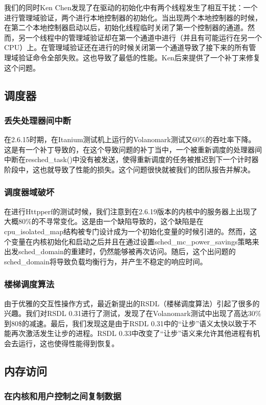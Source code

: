 我们的同时Ken Chen发现了在驱动的初始化中有两个线程发生了相互干扰：一个进行管理域验证，两个进行本地控制器的初始化。当出现两个本地控制器的时候，在第二个本地控制器启动以后，初始化线程临时关闭了第一个控制器的通道。然而，另一个线程中的管理域验证却在第一个通道中进行（并且有可能运行在另一个CPU）上。在管理域验证还在进行的时候关闭第一个通道导致了接下来的所有管理域验证命令全部失败。这也导致了最低的性能。Ken后来提供了一个补丁来修复这个问题。

\subsection{调度器}
\subsubsection{丢失处理器间中断}
在2.6.15时期，在Itanium测试机上运行的Volanomark测试又60\%的吞吐率下降。这是有一个补丁导致的，在这个导致问题的补丁当中，一个被重新调度的处理器间中断在resched\_task()中没有被发送，使得重新调度的任务被推迟到下一个计时器阶段中，这也就导致了性能的损失。这个问题很快就被我们的团队报告并解决。
\subsubsection{调度器域破坏}

在进行Httpperf的测试时候，我们注意到在2.6.19版本的内核中的服务器上出现了大概80\%的不寻常变化。这是由一个缺陷导致的，这个缺陷是在cpu\_isolated\_map结构被专门设计成为一个初始化变量的时候引进的。然而，这个变量在内核初始化和启动之后并且在通过设置sched\_mc\_power\_savings策略来出发sched\_domain的重建时，仍然能够被再次访问。随后，这个出问题的sched\_domain将导致负载均衡行为，并产生不稳定的响应时间。

\subsubsection{楼梯调度算法}
由于优雅的交互性操作方式，最近新提出的RSDL（楼梯调度算法）引起了很多的兴趣。我们对RSDL 0.31进行了测试，发现了在Volanomark测试中出现了高达30\%到80\$的减速。最后，我们发现这是由于RSDL 0.31中的“让步”语义太快以致于不能再次激活发生让步的进程。RSDL 0.33中改变了“让步”语义来允许其他进程有机会去运行，这也使得性能得到恢复。

\subsection{内存访问}
\subsubsection{在内核和用户控制之间复制数据}

